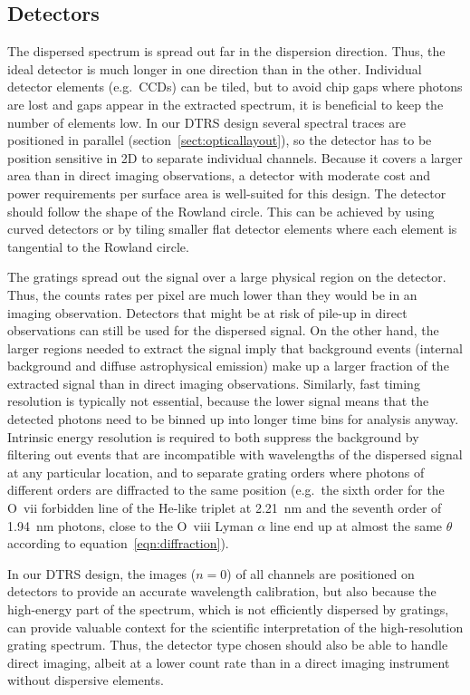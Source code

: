 \documentclass[linenumbers]{aastex631}
\begin{document}
\subsection{Detectors}
The dispersed spectrum is spread out far in the dispersion direction. Thus, the ideal detector is much longer in one direction than in the other. Individual detector elements (e.g.\ CCDs) can be tiled, but to avoid chip gaps where photons are lost and gaps appear in the extracted spectrum, it is beneficial to keep the number of elements low. In our DTRS design several spectral traces are positioned in parallel (section~\ref{sect:opticallayout}), so the detector has to be position sensitive in 2D to separate individual channels.  Because it covers a larger area than in direct imaging observations, a detector with moderate cost and power requirements per surface area is well-suited for this design. The detector should follow the shape of the Rowland circle. This can be achieved by using curved detectors or by tiling smaller flat detector elements where each element is tangential to the Rowland circle.

The gratings spread out the signal over a large physical region on the detector. Thus, the counts rates per pixel are much lower than they would be in an imaging observation. Detectors that might be at risk of pile-up in direct observations can still be used for the dispersed signal. On the other hand, the larger regions needed to extract the signal imply that background events (internal background and diffuse astrophysical emission) make up a larger fraction of the extracted signal than in direct imaging observations. Similarly, fast timing resolution is typically not essential, because the lower signal means that the detected photons need to be binned up into longer time bins for analysis anyway. Intrinsic energy resolution is required to both suppress the background by filtering out events that are incompatible with wavelengths of the dispersed signal at any particular location, and to separate grating orders where photons of different orders are diffracted to the same position (e.g.\ the sixth order for the O~{\sc vii} forbidden line of the He-like triplet at 2.21~nm and the seventh order of 1.94~nm photons, close to the O~{\sc viii} Lyman $\alpha$ line end up at almost the same $\theta$ according to equation~\ref{eqn:diffraction}).

In our DTRS design, the images ($n=0$) of all channels are positioned on detectors to provide an accurate wavelength calibration, but also because the high-energy part of the spectrum, which is not efficiently dispersed by gratings, can provide valuable context for the scientific interpretation of the high-resolution grating spectrum. Thus, the detector type chosen should also be able to handle direct imaging, albeit at a lower count rate than in a direct imaging instrument without dispersive elements.
\end{document}
